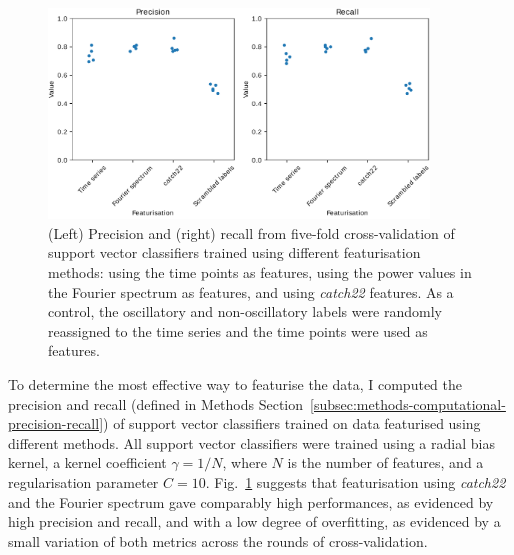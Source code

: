 \begin{figure}
  \centering
  \includegraphics[width=0.9\textwidth]{svm_feat_compare_edit.pdf}
  \caption[
    Precision and recall from five-fold cross-validation of support vector classifiers trained using different featurisation methods.
  ]{
    (Left) Precision and (right) recall from five-fold cross-validation of support vector classifiers trained using different featurisation methods:
    using the time points as features,
    using the power values in the Fourier spectrum as features,
    and using \emph{catch22} features.
    As a control, the oscillatory and non-oscillatory labels were randomly reassigned to the time series and the time points were used as features.
  }
  \label{fig:analysis-precision-recall}
\end{figure}


To determine the most effective way to featurise the data, I computed the precision and recall (defined in Methods Section~\ref{subsec:methods-computational-precision-recall}) of support vector classifiers trained on data featurised using different methods.
All support vector classifiers were trained using a radial bias kernel, a kernel coefficient $\gamma = 1/N$, where $N$ is the number of features, and a regularisation parameter $C = 10$.
Fig.\ \ref{fig:analysis-precision-recall} suggests that featurisation using \textit{catch22} and the Fourier spectrum gave comparably high performances, as evidenced by high precision and recall, and with a low degree of overfitting, as evidenced by a small variation of both metrics across the rounds of cross-validation.


